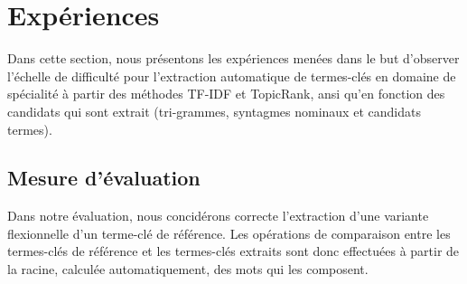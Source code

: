 \section{Expériences}
\label{sec:experiences}
  Dans cette section, nous présentons les expériences menées dans le but
  d'observer l'échelle de difficulté pour l'extraction automatique de
  termes-clés en domaine de spécialité à partir des méthodes TF-IDF et
  TopicRank, ansi qu'en fonction des candidats qui sont extrait (tri-grammes,
  syntagmes nominaux et candidats termes).

  \subsection{Mesure d'évaluation}
  \label{subsec:mesure_d_evaluation}
    Dans notre évaluation, nous concidérons correcte l'extraction d'une variante
    flexionnelle d'un terme-clé de référence. Les opérations de comparaison
    entre les termes-clés de référence et les termes-clés extraits sont donc
    effectuées à partir de la racine, calculée automatiquement, des mots qui les
    composent.

